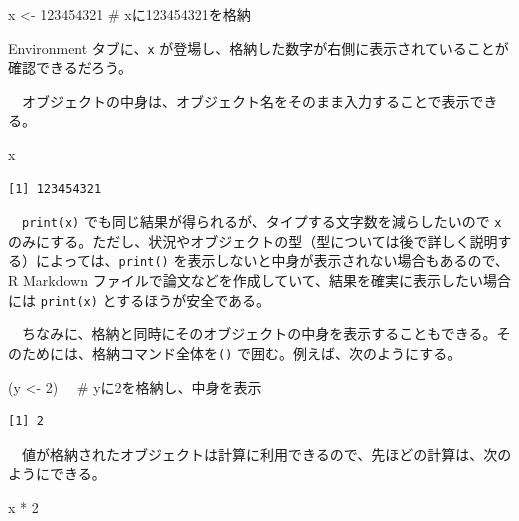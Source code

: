 \documentclass[
  a4paper,
  pandoc,
  ja=standard,
  jafont=haranoaji]{bxjsbook}
\newenvironment{Shaded}{\begin{snugshade}}{\end{snugshade}}
\newcommand{\CommentTok}[1]{\textcolor[rgb]{0.37,0.37,0.37}{#1}}
\newcommand{\DecValTok}[1]{\textcolor[rgb]{0.68,0.00,0.00}{#1}}
\newcommand{\NormalTok}[1]{\textcolor[rgb]{0.00,0.48,0.65}{#1}}
\newcommand{\OtherTok}[1]{\textcolor[rgb]{0.00,0.48,0.65}{#1}}
\newcommand{\SpecialCharTok}[1]{\textcolor[rgb]{0.37,0.37,0.37}{#1}}
\begin{document}
\begin{Shaded}
\begin{Highlighting}[numbers=left,,]
\NormalTok{x }\OtherTok{\textless{}{-}} \DecValTok{123454321}  \CommentTok{\# xに123454321を格納}
\end{Highlighting}
\end{Shaded}

Environment タブに、\texttt{x}
が登場し、格納した数字が右側に表示されていることが確認できるだろう。

　オブジェクトの中身は、オブジェクト名をそのまま入力することで表示できる。

\begin{Shaded}
\begin{Highlighting}[numbers=left,,]
\NormalTok{x}
\end{Highlighting}
\end{Shaded}

\begin{verbatim}
[1] 123454321
\end{verbatim}

　\texttt{print(x)}
でも同じ結果が得られるが、タイプする文字数を減らしたいので
\texttt{x}のみにする。ただし、状況やオブジェクトの型（型については後で詳しく説明する）によっては、\texttt{print()}
を表示しないと中身が表示されない場合もあるので、R Markdown
ファイルで論文などを作成していて、結果を確実に表示したい場合には
\texttt{print(x)} とするほうが安全である。

　ちなみに、格納と同時にそのオブジェクトの中身を表示することもできる。そのためには、格納コマンド全体を\texttt{()}
で囲む。例えば、次のようにする。

\begin{Shaded}
\begin{Highlighting}[numbers=left,,]
\NormalTok{(y }\OtherTok{\textless{}{-}} \DecValTok{2}\NormalTok{) 　}\CommentTok{\# yに2を格納し、中身を表示}
\end{Highlighting}
\end{Shaded}

\begin{verbatim}
[1] 2
\end{verbatim}

　値が格納されたオブジェクトは計算に利用できるので、先ほどの計算は、次のようにできる。

\begin{Shaded}
\begin{Highlighting}[numbers=left,,]
\NormalTok{x }\SpecialCharTok{*} \DecValTok{2}
\end{Highlighting}
\end{Shaded}
\end{document}
